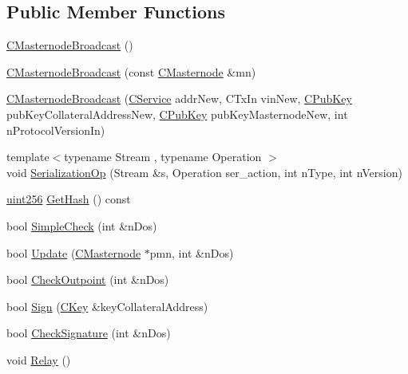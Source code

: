 \subsection*{Public Member Functions}
\begin{DoxyCompactItemize}
\item 
\mbox{\hyperlink{class_c_masternode_broadcast_a9d1ccae926af3714163d26b6b02223c5}{C\+Masternode\+Broadcast}} ()
\item 
\mbox{\hyperlink{class_c_masternode_broadcast_ad85a19b0a20ea5ad6a65bc98fcd40cea}{C\+Masternode\+Broadcast}} (const \mbox{\hyperlink{class_c_masternode}{C\+Masternode}} \&mn)
\item 
\mbox{\hyperlink{class_c_masternode_broadcast_aa8727d7ae24dc875e8c74948127ebd4e}{C\+Masternode\+Broadcast}} (\mbox{\hyperlink{class_c_service}{C\+Service}} addr\+New, C\+Tx\+In vin\+New, \mbox{\hyperlink{class_c_pub_key}{C\+Pub\+Key}} pub\+Key\+Collateral\+Address\+New, \mbox{\hyperlink{class_c_pub_key}{C\+Pub\+Key}} pub\+Key\+Masternode\+New, int n\+Protocol\+Version\+In)
\item 
{\footnotesize template$<$typename Stream , typename Operation $>$ }\\void \mbox{\hyperlink{class_c_masternode_broadcast_a6e697696503e9416437067cb33edc084}{Serialization\+Op}} (Stream \&s, Operation ser\+\_\+action, int n\+Type, int n\+Version)
\item 
\mbox{\hyperlink{classuint256}{uint256}} \mbox{\hyperlink{class_c_masternode_broadcast_a402adbbedd893b31ae21eeb436f2afb1}{Get\+Hash}} () const
\item 
bool \mbox{\hyperlink{class_c_masternode_broadcast_a614b26e3fa8e0151889ce4fc0bebd88e}{Simple\+Check}} (int \&n\+Dos)
\item 
bool \mbox{\hyperlink{class_c_masternode_broadcast_a7aa301dbc2d846092c3090734d4622cf}{Update}} (\mbox{\hyperlink{class_c_masternode}{C\+Masternode}} $\ast$pmn, int \&n\+Dos)
\item 
bool \mbox{\hyperlink{class_c_masternode_broadcast_ad3e6be4a6f0206e5d8e6dcb427d169ce}{Check\+Outpoint}} (int \&n\+Dos)
\item 
bool \mbox{\hyperlink{class_c_masternode_broadcast_a60496c36bcb74c3f5516faac1a08b376}{Sign}} (\mbox{\hyperlink{class_c_key}{C\+Key}} \&key\+Collateral\+Address)
\item 
bool \mbox{\hyperlink{class_c_masternode_broadcast_a12769e5247ac34008e887ba6bb04496a}{Check\+Signature}} (int \&n\+Dos)
\item 
void \mbox{\hyperlink{class_c_masternode_broadcast_a54fc9e822e1524bee8852a0bf6d82736}{Relay}} ()
\end{DoxyCompactItemize}
